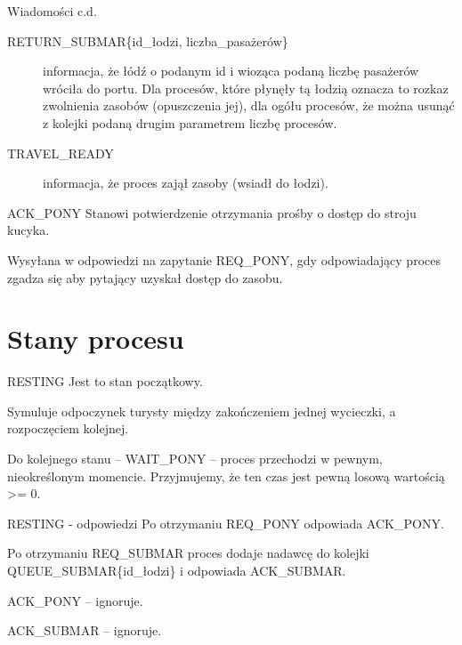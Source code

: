 \documentclass{beamer}
\begin{document}
\begin{frame}{Wiadomości c.d.}
    \internallinenumbers
    \begin{description}
        \item [RETURN\_SUBMAR\{id\_łodzi, liczba\_pasażerów\}] informacja, że łódź o podanym id i wioząca podaną liczbę pasażerów wróciła do portu. Dla procesów, które płynęły tą łodzią oznacza to rozkaz zwolnienia zasobów (opuszczenia jej), dla ogółu procesów, że można usunąć z kolejki podaną drugim parametrem liczbę procesów.
        \item [TRAVEL\_READY] informacja, że proces zajął zasoby (wsiadł do łodzi).
    \end{description}

\end{frame}

\begin{frame}{ACK\_PONY}
    \internallinenumbers
    \resetlinenumber[1]
    Stanowi potwierdzenie otrzymania prośby o dostęp do stroju kucyka.

    \vspace{1cm}
    Wysyłana w odpowiedzi na zapytanie REQ\_PONY, gdy odpowiadający proces zgadza się aby pytający uzyskał dostęp do zasobu.
\end{frame}

\section{Stany procesu}
\begin{frame}{RESTING}
    \internallinenumbers
    \resetlinenumber[1]
    Jest to stan początkowy.

    \vspace{1cm}
    Symuluje odpoczynek turysty między zakończeniem jednej wycieczki, a rozpoczęciem kolejnej.

    \vspace{1cm}
    Do kolejnego stanu – WAIT\_PONY – proces przechodzi w pewnym, nieokreślonym momencie. Przyjmujemy, że ten czas jest pewną losową wartością >= 0.
\end{frame}

\begin{frame}{RESTING - odpowiedzi}
    \internallinenumbers
    \resetlinenumber[1]
    Po otrzymaniu REQ\_PONY odpowiada ACK\_PONY.

    \vspace{1cm}
    Po otrzymaniu REQ\_SUBMAR proces dodaje nadawcę do kolejki QUEUE\_SUBMAR\{id\_łodzi\} i odpowiada ACK\_SUBMAR.

    \vspace{1cm}
    ACK\_PONY – ignoruje.

    \vspace{1cm}
    ACK\_SUBMAR – ignoruje.
\end{frame}
\end{document}
